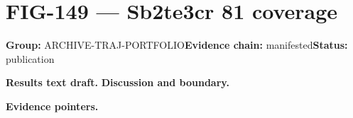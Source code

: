 \clearpage
\section{FIG-149 --- Sb2te3cr 81 coverage}
\label{figpage:fig-149}
\textbf{Group:} ARCHIVE-TRAJ-PORTFOLIO\quad \textbf{Evidence chain:} manifested\quad \textbf{Status:} publication

\textbf{Results text draft.} 
\textbf{Discussion and boundary.} 


\textbf{Evidence pointers.}



\vfill
